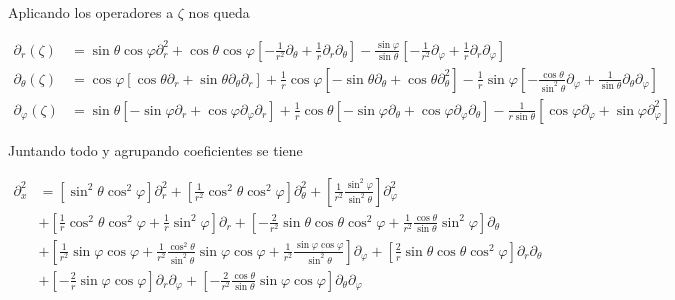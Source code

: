\documentclass[11pt]{article}
\numberwithin{equation}{section}
\begin{document}
Aplicando los operadores a \(\zeta\) nos queda

\begin{align*}
	\partial_{r}(\zeta)
	&=
	\sin\theta \cos\varphi
	\partial^2_r
	+
	\cos\theta \cos\varphi
	\left[
		-\frac{1}{r^2} \partial_{\theta}
		+
		\frac{1}{r} \partial_{r} \partial_{\theta}
	\right]
	-
	\frac{\sin\varphi}{\sin\theta}
	\left[
		-\frac{1}{r^2} \partial_{\varphi}
		+
		\frac{1}{r} \partial_{r} \partial_{\varphi}
	\right]
	\\
	\partial_{\theta}(\zeta)
	&=
	\cos\varphi
	\left[
		\cos\theta \partial_{r}
		+
		\sin\theta \partial_{\theta} \partial_{r}
	\right]
	+
	\frac{1}{r} \cos\varphi
	\left[
		-\sin\theta \partial_{\theta}
		+
		\cos\theta \partial^2_{\theta}
	\right]
	- \frac{1}{r} \sin\varphi
	\left[
		-\frac{\cos\theta}{\sin^2\theta} \partial_{\varphi}
		+
		\frac{1}{\sin\theta} \partial_{\theta} \partial_{\varphi}
	\right]
	\\
	\partial_{\varphi} (\zeta)
	&=
	\sin\theta
	\left[
		-\sin\varphi \partial_{r}
		+
		\cos\varphi \partial_{\varphi} \partial_{r}
	\right]
	+
	\frac{1}{r} \cos\theta
	\left[
		-\sin\varphi \partial_{\theta}
		+
		\cos\varphi \partial_{\varphi} \partial_{\theta}
	\right]
	- \frac{1}{r\sin\theta}
	\left[
		\cos\varphi \partial_{\varphi}
		+
		\sin\varphi \partial^2_{\varphi}
	\right]
\end{align*}

Juntando todo y agrupando coeficientes se tiene

\begin{align*}
	\partial^2_x
	&=
	\left[
		\sin^2\theta \cos^2\varphi
	\right]
	\partial^2_{r}
	+
	\left[
		\frac{1}{r^2} \cos^2\theta \cos^2\varphi
	\right]
	\partial^2_{\theta}
	+
	\left[
		\frac{1}{r^2} \frac{\sin^2\varphi}{\sin^2\theta}
	\right]
	\partial^2_{\varphi}
	\\&+
	\left[
		\frac{1}{r} \cos^2\theta \cos^2\varphi
		+
		\frac{1}{r} \sin^2\varphi
	\right]
	\partial_{r}
	+
	\left[
		-\frac{2}{r^2} \sin\theta \cos\theta \cos^2\varphi
		+
		\frac{1}{r^2} \frac{\cos\theta}{\sin\theta} \sin^2\varphi
	\right]
	\partial_{\theta}
	\\&+
	\left[
		\frac{1}{r^2} \sin\varphi \cos\varphi
		+
		\frac{1}{r^2} \frac{\cos^2\theta}{\sin^2\theta} \sin\varphi \cos\varphi
		+
		\frac{1}{r^2} \frac{\sin\varphi \cos\varphi}{\sin^2 \theta}
	\right]
	\partial_{\varphi}
	+
	\left[
		\frac{2}{r} \sin\theta \cos\theta \cos^2 \varphi
	\right]
	\partial_{r} \partial_{\theta}
	\\&+
	\left[
		-\frac{2}{r} \sin\varphi \cos\varphi
	\right]
	\partial_{r} \partial_{\varphi}
	+
	\left[
		-\frac{2}{r^2} \frac{\cos\theta}{\sin\theta} \sin\varphi \cos\varphi
	\right]
	\partial_{\theta} \partial_{\varphi}
\end{align*}
\end{document}
